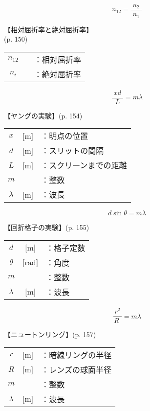 \documentclass[10pt]{jarticle}
\begin{document}
\newpage

\[
n_{12} = \frac{n_2}{\; n_1 \;}
\]


\vskip3mm
【相対屈折率と絶対屈折率】\\
\hfill {\footnotesize (p. 150)}

\begin{tabular}{ccl}
$n_{12}$	&	&：相対屈折率\\
$n_i$	&	&：絶対屈折率\\
\end{tabular}

\newpage






\[
\frac{\; xd \;}{L} = m \lambda
\]


\vskip3mm
【ヤングの実験】{\footnotesize (p. 154)}

\begin{tabular}{ccl}
$x$	&[m]	&：明点の位置\\
$d$	&[m]	&：スリットの間隔\\
$L$	&[m]	&：{\small スクリーンまでの距離}\\
$m$	&	&：整数\\
$\lambda$	&[m]	&：波長
\end{tabular}

\newpage




\[
d \sin\theta = m \lambda
\]


\vskip3mm
【回折格子の実験】{\footnotesize (p. 155)}

\begin{tabular}{ccl}
$d$	&[m]	&：格子定数\\
$\theta$	&[rad]	&：角度\\
$m$	&	&：整数\\
$\lambda$	&[m]	&：波長\\
\end{tabular}

\newpage




\[
\frac{\, r^2\, }{R \;} = m \lambda
\]


\vskip3mm
【ニュートンリング】{\footnotesize (p. 157)}

\begin{tabular}{ccl}
$r$	&[m]	&：暗線リングの半径\\
$R$	&[m]	&：レンズの球面半径\\
$m$	&	&：整数\\
$\lambda$	&[m]	&：波長\\
\end{tabular}
\end{document}
